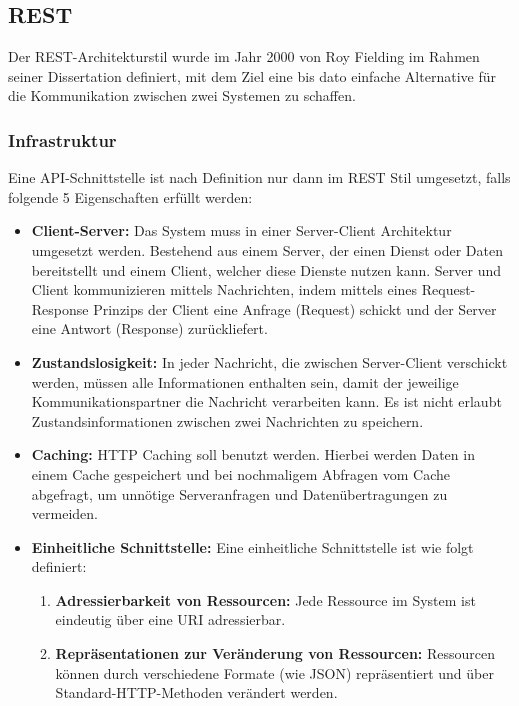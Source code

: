 \subsection{REST}
Der REST-Architekturstil wurde im Jahr 2000 von Roy Fielding im Rahmen seiner Dissertation definiert, mit dem Ziel eine bis dato einfache Alternative für die Kommunikation zwischen zwei Systemen zu schaffen.

\subsubsection*{Infrastruktur}
Eine API-Schnittstelle ist nach Definition nur dann im REST Stil umgesetzt, falls folgende 5 Eigenschaften erfüllt werden:


\begin{itemize}
	\item \textbf{Client-Server:}
Das System muss in einer Server-Client Architektur umgesetzt werden. Bestehend aus einem Server, der einen Dienst oder Daten bereitstellt und einem Client, welcher diese Dienste nutzen kann. Server und Client kommunizieren mittels Nachrichten, indem mittels eines Request-Response Prinzips der Client eine Anfrage (Request) schickt und der Server eine Antwort (Response) zurückliefert.
	
	\item \textbf{Zustandslosigkeit:} 
In jeder Nachricht, die zwischen Server-Client verschickt werden, müssen alle Informationen enthalten sein, damit der jeweilige Kommunikationspartner die Nachricht verarbeiten kann. Es ist nicht erlaubt Zustandsinformationen zwischen zwei Nachrichten zu speichern.
	\item \textbf{Caching:}
HTTP Caching soll benutzt werden. Hierbei werden Daten in einem Cache gespeichert und bei nochmaligem Abfragen vom Cache abgefragt, um unnötige Serveranfragen und Datenübertragungen zu vermeiden.
	\item \textbf{Einheitliche Schnittstelle:}
	Eine einheitliche Schnittstelle ist wie folgt definiert:
	
	\begin{enumerate}
		\item \textbf{Adressierbarkeit von Ressourcen:}
		Jede Ressource im System ist eindeutig über eine URI adressierbar.
		\item \textbf{Repräsentationen zur Veränderung von Ressourcen:}
		Ressourcen können durch verschiedene Formate (wie JSON) repräsentiert und über Standard-HTTP-Methoden verändert werden.
		

\end{enumerate}
\end{itemize}
